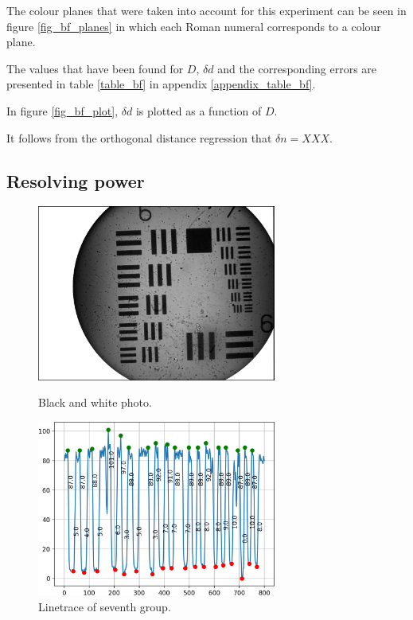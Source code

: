 The colour planes that were taken into account for this experiment can be seen in figure \ref{fig_bf_planes} in which each Roman numeral corresponds to a colour plane.


The values that have been found for $D$, $\delta d$ and the corresponding errors are presented in table \ref{table_bf} in appendix \ref{appendix_table_bf}.

In figure \ref{fig_bf_plot}, $\delta d$ is plotted as a function of $D$.


It follows from the orthogonal distance regression that $\delta n = XXX$.







\subsection{Resolving power}
\begin{figure}[h!]
    \centering
    \begin{minipage}{.5\textwidth}
      \centering
      \includegraphics[width=0.7\textwidth,keepaspectratio]{afbeeldingen/process_visibility/m3_bw.jpg}
      \caption{Black and white photo.}
      \label{fig:resolution_target}
    \end{minipage}%
    \begin{minipage}{.5\textwidth}
      \centering
      \includegraphics[width=0.7\textwidth,keepaspectratio]{afbeeldingen/process_visibility/m3_rpg_7.png}
      \caption{Linetrace of seventh group.}
      \label{fig:linetrace}
    \end{minipage}
\end{figure}

